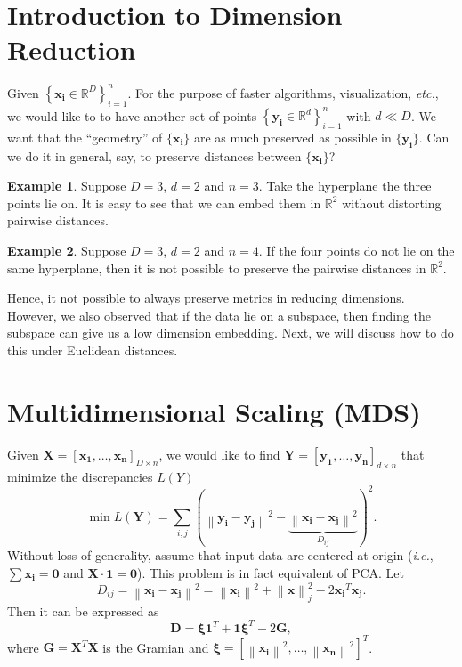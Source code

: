 \documentclass[11pt]{article}
\newcommand{\norm}[1]{\left\lVert#1\right\rVert}
\theoremstyle{definition}
\newtheorem{Example}{Example}
\begin{document}
\section{Introduction to Dimension Reduction}
Given $\left\{\mathbf{x_i} \in \mathbb{R}^D\right\}_{i=1}^n$. For the purpose of faster algorithms, visualization, \textit{etc.}, we  would like to  to have another set of points  $\left\{\mathbf{y_i}\in\mathbb{R}^d\right\}_{i=1}^n $ with $d\ll D$. We want that the ``geometry'' of $\{\mathbf{x_i}\}$ are as much preserved as possible in $\{\mathbf{y_i}\}$. Can we do it in general, say, to preserve distances between $\{\mathbf{x_i}\}$?
\begin{Example}
    Suppose $D=3$, $d=2$ and $n=3$. Take the hyperplane the three points lie on. It is easy to see that we can embed them in $\mathbb{R}^2$ without distorting pairwise distances.
\end{Example}
\begin{Example}
    Suppose $D=3$, $d=2$ and $n=4$. If the four points do not lie on the same hyperplane, then it is not possible to preserve the pairwise distances in $\mathbb{R}^2$.
\end{Example}
Hence, it not possible to always preserve metrics in reducing dimensions. However, we also observed that if the data lie on a subspace, then finding the subspace can give us a low dimension embedding. Next, we will discuss how to do this under Euclidean distances.

\section{Multidimensional Scaling (MDS)}
Given $\mathbf{X} = [\mathbf{x_1},\ldots,\mathbf{x_n}]_{D\times n}$, we would like to find $\mathbf{Y}= [\mathbf{y_1},\ldots, \mathbf{y_n}]_{d\times n}$ that minimize the discrepancies $L(Y)$
\[
    \min L(\mathbf{Y}) = \sum_{i,j} \left(\norm{\mathbf{y_i}-\mathbf{y_j}}^2-\underbrace{\norm{\mathbf{x_i}-\mathbf{x_j}}^2}_{D_{ij}}\right)^2.
\]
Without loss of generality, assume that input data are centered at origin (\textit{i.e.}, $\sum \mathbf{x_i} = \mathbf{0}$ and $\mathbf{X}\cdot \mathbf{1} = \mathbf{0}$).  This problem is in fact equivalent of PCA\@. Let $$D_{ij} = \norm{\mathbf{x_i}-\mathbf{x_j}}^2 = \norm{\mathbf{x_i}}^2 + \norm{\mathbf{x}}_j^2 - 2\mathbf{x_i}^T\mathbf{x_j}.$$ Then it can be expressed as
\[
    \mathbf{D} = \bm{\xi}\mathbf{1}^T +  \mathbf{1}\bm{\xi}^T - 2\bm{G}, 
\]
where $\mathbf{G} = \mathbf{X}^T\mathbf{X}$ is the Gramian and $\bm{\xi} = \left[\norm{\mathbf{x_i}}^2 , \ldots, \norm{\mathbf{x_n}}^2\right]^T$.



\end{document}
